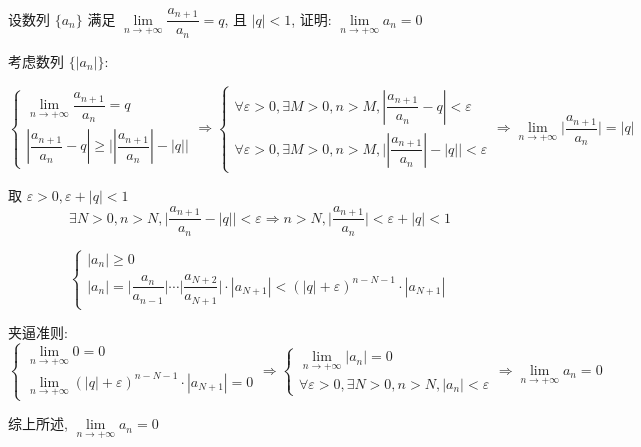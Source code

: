 \begin{proposition}
	设数列 $\{a_{n}\}$ 满足 $\lim\limits_{n\rightarrow+\infty}\dfrac{a_{n+1}}{a_{n}}=q$, 且 $|q|<1$, 证明: $\lim\limits_{n\rightarrow+\infty}a_{n}=0$
\end{proposition}
\begin{solution}
	
	考虑数列 $\{|a_{n}|\}$:

	$$\begin{cases}
		\lim\limits_{n\rightarrow+\infty}\dfrac{a_{n+1}}{a_{n}} = q\\
		|\dfrac{a_{n+1}}{a_{n}}-q| \geq \big||\dfrac{a_{n+1}}{a_{n}}|-|q|\big| 
	\end{cases}\Rightarrow
	\begin{cases}
		\forall \varepsilon > 0, \exists M > 0, n > M, |\dfrac{a_{n+1}}{a_{n}}-q| < \varepsilon \\
		\forall \varepsilon > 0, \exists M > 0, n > M, \big||\dfrac{a_{n+1}}{a_{n}}|-|q|\big| < \varepsilon
	\end{cases}
	\Rightarrow \lim\limits_{n\rightarrow+\infty}\big|\dfrac{a_{n+1}}{a_{n}}\big| = |q|$$
	
	取 $\varepsilon > 0 ,\varepsilon + |q| < 1$
	$$\exists N > 0, n > N, \big|\dfrac{a_{n+1}}{a_{n}}-|q|\big| < \varepsilon \Rightarrow n > N, \big| \dfrac{a_{n+1}}{a_{n}}\big| < \varepsilon + |q| < 1$$
	
	$$\begin{cases}
		|a_{n}| \geq 0\\
		|a_{n}| = \big|\dfrac{a_{n}}{a_{n-1}}\big|\cdots\big|\dfrac{a_{N+2}}{a_{N+1}}\big|\cdot|a_{N+1}| <  (|q|+\varepsilon)^{n-N-1}\cdot |a_{N+1}|
	\end{cases}$$

	夹逼准则:
	$$
	\begin{cases} 
		\lim\limits_{n\to +\infty} 0 = 0\\
		\lim\limits_{n\to +\infty} (|q|+\varepsilon)^{n-N-1}\cdot |a_{N+1}| = 0
	\end{cases}\Rightarrow
	\begin{cases}
		\lim\limits_{n\to +\infty} |a_{n}| = 0\\
		\forall \varepsilon > 0, \exists N > 0, n > N, |a_{n}| < \varepsilon
	\end{cases}
	\Rightarrow \lim\limits_{n\to +\infty} a_{n} = 0 
	$$
	
	综上所述, $\lim\limits_{n\rightarrow+\infty}a_{n}=0$
\end{solution}

